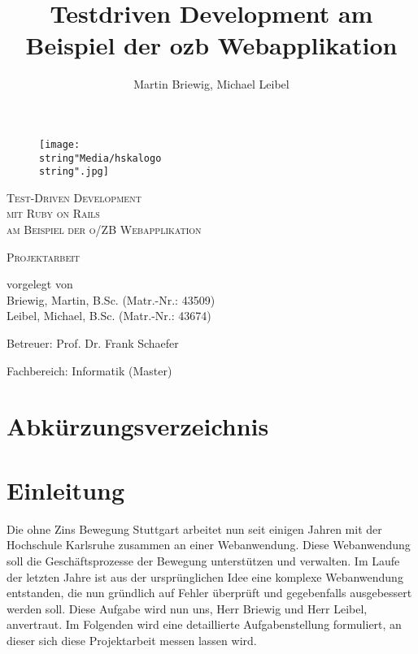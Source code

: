 \documentclass[12pt,             %
               a4paper,          %
               listof=totoc,     %
               index=totoc,      %
               bibliography=totoc,%
               oneside,         %
               BCOR1cm,          %
               english   %
               ]{scrbook}
\title{Testdriven Development am Beispiel der ozb Webapplikation}
\author{Martin Briewig, Michael Leibel}
\begin{document}
\pagestyle{empty}
\begin{center}

\begin{figure}[h]
	\begin{center}
		\texttt{[image: \\string"Media/hskalogo\\string".jpg]}
	\end{center}
	\label{fig:hska_logo}
\end{figure} 

\vspace{5\baselineskip}

\textsc{\Huge Test-Driven Development\\ mit Ruby on Rails}\\[0.25cm]
\textsc{\large am Beispiel der o/ZB Webapplikation}\\[1.5cm]


\vspace{2\baselineskip}

\textsc{\LARGE Projektarbeit}\\[1.5cm]


\vspace{5\baselineskip}

vorgelegt von\\
Briewig, Martin, B.Sc. (Matr.-Nr.: 43509)\\
Leibel, Michael, B.Sc. (Matr.-Nr.: 43674)

\vspace{\baselineskip}

Betreuer: Prof. Dr. Frank Schaefer

Fachbereich: Informatik (Master)
\end{center}

\clearpage{}


\tableofcontents{}

\clearpage{}

\chapter*{Abkürzungsverzeichnis}

\begin{acronym}[SQL]
\end{acronym}

\newpage

\chapter{Einleitung}
Die ohne Zins Bewegung Stuttgart arbeitet nun seit einigen Jahren mit der Hochschule Karlsruhe zusammen an einer Webanwendung. Diese Webanwendung soll die Geschäftsprozesse der Bewegung unterstützen und verwalten. Im Laufe der letzten Jahre ist aus der ursprünglichen Idee eine komplexe Webanwendung entstanden, die nun gründlich auf Fehler überprüft und gegebenfalls ausgebessert werden soll. 
Diese Aufgabe wird nun uns, Herr Briewig und Herr Leibel, anvertraut. Im Folgenden wird eine detaillierte Aufgabenstellung formuliert, an dieser sich diese Projektarbeit messen lassen wird.  
\end{document}
